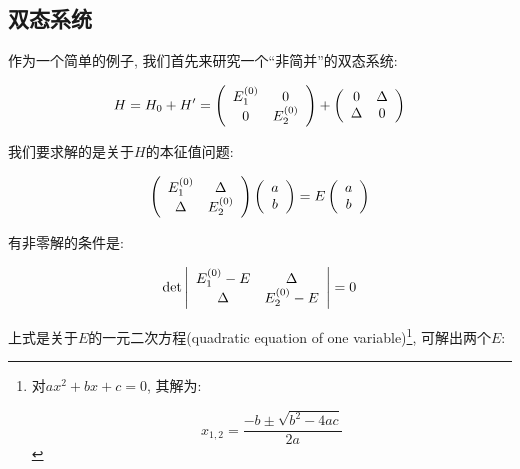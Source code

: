 \subsection{双态系统}

作为一个简单的例子, 我们首先来研究一个``非简并''的双态系统:

\begin{equation}\label{Non-degenerate two state system}
H = H_0 + H' = \left( {\begin{array}{*{20}c}
   E_1^{(0)} & 0  \\
   0 & E_2^{(0)}  \\
 \end{array} } \right)
+ \left( {\begin{array}{*{20}c}
   0 & \Delta  \\
   \Delta & 0  \\
 \end{array} } \right)
\end{equation}

我们要求解的是关于$H$的本征值问题:

\begin{equation*}
\left( {\begin{array}{*{20}c}
   E_1^{(0)} & \Delta  \\
   \Delta & E_2^{(0)}  \\
 \end{array} } \right)
\left( {\begin{array}{*{20}c}
   a  \\
   b  \\
 \end{array} } \right)
= E \left( {\begin{array}{*{20}c}
   a  \\
   b  \\
 \end{array} } \right)
\end{equation*}

有非零解的条件是:

\begin{equation*}
\det \left| {\begin{array}{*{20}c}
   E_1^{(0)}-E & \Delta  \\
   \Delta & E_2^{(0)}-E  \\
 \end{array} } \right|
= 0
\end{equation*}

上式是关于$E$的一元二次方程(quadratic equation of one
variable)\footnote{对$ax^2 + bx +c=0$, 其解为:

\begin{equation*}
x_{1,2}=\frac{-b \pm \sqrt{b^2 - 4ac}}{2a}
\end{equation*}
}, 可解出两个$E$:

